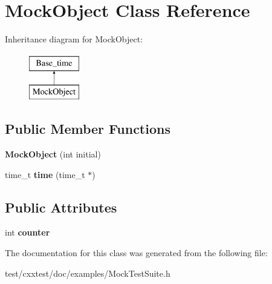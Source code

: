 \hypertarget{classMockObject}{\section{Mock\-Object Class Reference}
\label{classMockObject}
}
Inheritance diagram for Mock\-Object\-:\begin{figure}[H]
\begin{center}
\leavevmode
\includegraphics[height=2.000000cm]{classMockObject}
\end{center}
\end{figure}
\subsection*{Public Member Functions}
\begin{DoxyCompactItemize}
\item 
\hypertarget{classMockObject_ad2891f6ce5643b0d9b91ea07bf77d96f}{{\bfseries Mock\-Object} (int initial)}\label{classMockObject_ad2891f6ce5643b0d9b91ea07bf77d96f}

\item 
\hypertarget{classMockObject_a0e01a9f7dafd68d71739ab3bd7275116}{time\-\_\-t {\bfseries time} (time\-\_\-t $\ast$)}\label{classMockObject_a0e01a9f7dafd68d71739ab3bd7275116}

\end{DoxyCompactItemize}
\subsection*{Public Attributes}
\begin{DoxyCompactItemize}
\item 
\hypertarget{classMockObject_ae818f4a20ede7fc02c2840765650020b}{int {\bfseries counter}}\label{classMockObject_ae818f4a20ede7fc02c2840765650020b}

\end{DoxyCompactItemize}


The documentation for this class was generated from the following file\-:\begin{DoxyCompactItemize}
\item 
test/cxxtest/doc/examples/Mock\-Test\-Suite.\-h\end{DoxyCompactItemize}
